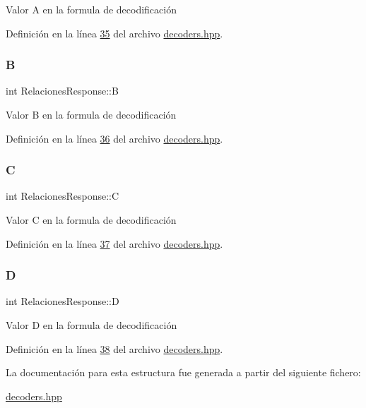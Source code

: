 Valor A en la formula de decodificación 

Definición en la línea \hyperlink{decoders_8hpp_source_l00035}{35} del archivo \hyperlink{decoders_8hpp_source}{decoders.\+hpp}.

\mbox{\label{structRelacionesResponse_a1216f6019af393dd85853f352533ed9d}} 
\subsubsection{\texorpdfstring{B}{B}}
{\footnotesize\ttfamily int Relaciones\+Response\+::B}

Valor B en la formula de decodificación 

Definición en la línea \hyperlink{decoders_8hpp_source_l00036}{36} del archivo \hyperlink{decoders_8hpp_source}{decoders.\+hpp}.

\mbox{\label{structRelacionesResponse_a37feda02f128b77f4f2d61cabcddc9e7}} 
\subsubsection{\texorpdfstring{C}{C}}
{\footnotesize\ttfamily int Relaciones\+Response\+::C}

Valor C en la formula de decodificación 

Definición en la línea \hyperlink{decoders_8hpp_source_l00037}{37} del archivo \hyperlink{decoders_8hpp_source}{decoders.\+hpp}.

\mbox{\label{structRelacionesResponse_ab76f55b12df3754a9bb5b102a1c06cbc}} 
\subsubsection{\texorpdfstring{D}{D}}
{\footnotesize\ttfamily int Relaciones\+Response\+::D}

Valor D en la formula de decodificación 

Definición en la línea \hyperlink{decoders_8hpp_source_l00038}{38} del archivo \hyperlink{decoders_8hpp_source}{decoders.\+hpp}.



La documentación para esta estructura fue generada a partir del siguiente fichero\+:\begin{DoxyCompactItemize}
\item 
\hyperlink{decoders_8hpp}{decoders.\+hpp}\end{DoxyCompactItemize}
